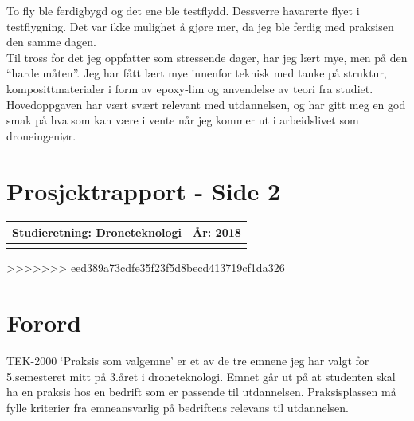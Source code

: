 \documentclass[12pt, a4paper]{article}
\begin{document}
To fly ble ferdigbygd og det ene ble testflydd. Dessverre havarerte flyet i testflygning. Det var ikke mulighet å gjøre mer, da jeg ble ferdig med praksisen den samme dagen. \\

Til tross for det jeg oppfatter som stressende dager, har jeg lært mye, men på den ``harde måten''. Jeg har fått lært mye innenfor teknisk med tanke på struktur, komposittmaterialer i form av epoxy-lim og anvendelse av teori fra studiet. Hovedoppgaven har vært svært relevant med utdannelsen, og har gitt meg en god smak på hva som kan være i vente når jeg kommer ut i arbeidslivet som droneingeniør. \\

\newpage

\clearpage
\section{Prosjektrapport - Side 2}

\begin{tabular}{ | l | l | }
	\hline
	\textbf{Studieretning: Droneteknologi}\hspace{5cm} & \textbf{År: 2018} \\
	\hline
	\vspace{1cm}
	\hline
\end{tabular}


\clearpage
\begin{minipage}[b]{1\linewidth}
	\tableofcontents
	\vspace{.5cm}
\end{minipage}
\begin{minipage}[b]{1\linewidth}
	\listoffigures
\end{minipage}
\clearpage
>>>>>>> eed389a73cdfe35f23f5d8becd413719cf1da326

\section{Forord}
TEK-2000 `Praksis som valgemne' er et av de tre emnene jeg har valgt for 5.semesteret mitt på 3.året i droneteknologi. Emnet går ut på at studenten skal ha en praksis hos en bedrift som er passende til utdannelsen. Praksisplassen må fylle kriterier fra emneansvarlig på bedriftens relevans til utdannelsen. \\
\end{document}
